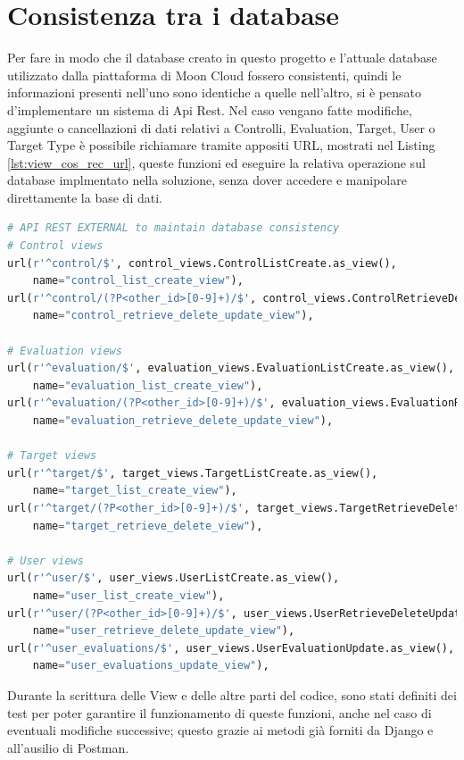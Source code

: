 \section*{Consistenza tra i database}
Per fare in modo che il database creato in questo progetto e l'attuale database utilizzato dalla piattaforma di Moon Cloud 
fossero consistenti, quindi le informazioni presenti nell'uno sono identiche a quelle nell'altro, si è 
pensato d'implementare un sistema di Api Rest.\hfill\break
Nel caso vengano fatte modifiche, aggiunte o cancellazioni di dati relativi a Controlli, Evaluation, Target, User o Target Type 
è possibile richiamare tramite appositi URL, mostrati nel Listing \ref{lst:view_cos_rec_url}, queste funzioni ed eseguire la relativa 
operazione sul database implmentato nella soluzione, senza dover accedere e manipolare direttamente la base di dati.
\lstset{style=python_code_style}
\begin{lstlisting}[language=Python, label=lst:view_cos_rec_url, caption={Porzione di codice dell'URL Mapper contenti le URL usate per 
    mantenere la consistenza dei dati.}]
# API REST EXTERNAL to maintain database consistency
# Control views
url(r'^control/$', control_views.ControlListCreate.as_view(),
    name="control_list_create_view"),
url(r'^control/(?P<other_id>[0-9]+)/$', control_views.ControlRetrieveDeleteUpdate.as_view(),
    name="control_retrieve_delete_update_view"),
 
# Evaluation views
url(r'^evaluation/$', evaluation_views.EvaluationListCreate.as_view(),
    name="evaluation_list_create_view"),
url(r'^evaluation/(?P<other_id>[0-9]+)/$', evaluation_views.EvaluationRetrieveDeleteUpdate.as_view(),
    name="evaluation_retrieve_delete_update_view"),
 
# Target views
url(r'^target/$', target_views.TargetListCreate.as_view(),
    name="target_list_create_view"),
url(r'^target/(?P<other_id>[0-9]+)/$', target_views.TargetRetrieveDelete.as_view(),
    name="target_retrieve_delete_view"),
 
# User views
url(r'^user/$', user_views.UserListCreate.as_view(),
    name="user_list_create_view"),
url(r'^user/(?P<other_id>[0-9]+)/$', user_views.UserRetrieveDeleteUpdate.as_view(),
    name="user_retrieve_delete_update_view"),
url(r'^user_evaluations/$', user_views.UserEvaluationUpdate.as_view(),
    name="user_evaluations_update_view"),
\end{lstlisting}
%
Durante la scrittura delle View e delle altre parti del codice, sono stati definiti dei test per poter garantire il funzionamento di queste 
funzioni, anche nel caso di eventuali modifiche successive; questo grazie ai metodi già forniti da Django e all'ausilio di Postman.
%
